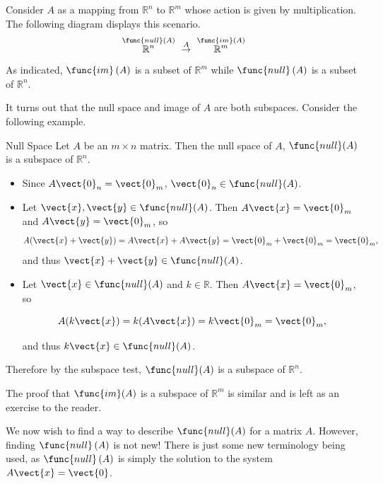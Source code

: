 Consider
$A$ as a mapping from $\mathbb{R}^{n}$ to $\mathbb{R}^{m}$ whose action is given by multiplication. The following diagram displays this scenario. 
\begin{equation*}
\overset{\func{null} \left( A\right) }{\mathbb{R}^{n}}\ \overset{A}{\rightarrow }\ 
\overset{
\func{im}\left( A\right) }{\mathbb{R}^{m}}
\end{equation*}
As indicated, $\func{im}\left( A\right) $ is a subset of $\mathbb{R}^{m}$
while $\func{null} \left( A\right) $ is a subset of $\mathbb{R}^{n}$.

It turns out that the null space and image of $A$ are both subspaces. Consider the following example.

\begin{example}{Null Space}\label{exa:nullsubspace}
Let $A$ be an $m\times n$ matrix. Then the null space of $A$, $\func{null}(A)$ is 
a subspace of $\mathbb{R}^n$.
\end{example}

\begin{solution}
\begin{itemize}
\item Since $A\vect{0}_n=\vect{0}_m$, 
$\vect{0}_n\in\func{null}(A)$.

\item Let $\vect{x},\vect{y}\in\func{null}(A)$. 
Then $A\vect{x}=\vect{0}_m$ and $A\vect{y}=\vect{0}_m$, so
\[ A(\vect{x}+\vect{y})=A\vect{x}+A\vect{y} = \vect{0}_m+\vect{0}_m=\vect{0}_m,\]
and thus $\vect{x}+\vect{y}\in\func{null}(A)$.
\item Let $\vect{x}\in\func{null}(A)$ and $k\in\mathbb{R}$.
Then $A\vect{x}=\vect{0}_m$, so

\[ A(k\vect{x}) = k(A\vect{x})=k\vect{0}_m=\vect{0}_m,\]

and thus $k\vect{x}\in\func{null}(A)$.
\end{itemize}
Therefore by the subspace test, $\func{null}(A)$ is a subspace of $\mathbb{R}^n$.

\end{solution}

The proof that $\func{im}(A)$ is a subspace of $\mathbb{R}^m$ is similar and is left as an exercise to the reader. 

We now wish to find a way to describe $\func{null}(A)$ for a matrix $A$. However, finding $\func{null} \left( A\right)$ is not new! There is just some new
terminology being used, as $\func{null} \left( A\right) $ is simply the solution
to the system $A\vect{x}=\vect{0}$.

